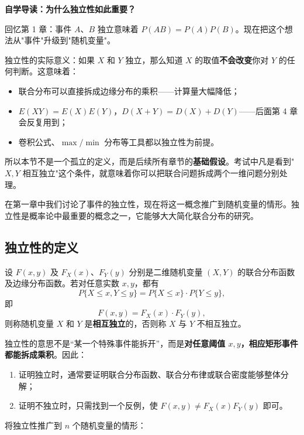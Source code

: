 ﻿\documentclass[lang=cn,11pt]{elegantbook}
\begin{document}
\begin{note}
\textbf{自学导读：为什么独立性如此重要？}

回忆第 1 章：事件 $A$、$B$ 独立意味着 $P(AB)=P(A)P(B)$。现在把这个想法从"事件"升级到"随机变量"。

独立性的实际意义：如果 $X$ 和 $Y$ 独立，那么知道 $X$ 的取值\textbf{不会改变}你对 $Y$ 的任何判断。这意味着：
\begin{itemize}
    \item 联合分布可以直接拆成边缘分布的乘积——计算量大幅降低；
    \item $E(XY)=E(X)E(Y)$，$D(X+Y)=D(X)+D(Y)$——后面第 4 章会反复用到；
    \item 卷积公式、$\max/\min$ 分布等工具都以独立性为前提。
\end{itemize}
所以本节不是一个孤立的定义，而是后续所有章节的\textbf{基础假设}。考试中凡是看到"$X,Y$ 相互独立"这个条件，就意味着你可以把联合问题拆成两个一维问题分别处理。
\end{note}

在第一章中我们讨论了事件的独立性，现在将这一概念推广到随机变量的情形。独立性是概率论中最重要的概念之一，它能够大大简化联合分布的研究。

\subsection{独立性的定义}

\begin{definition}[两个随机变量的独立性] \label{def:2d-independence}
设 $F(x,y)$ 及 $F_X(x)$、$F_Y(y)$ 分别是二维随机变量 $(X,Y)$ 的联合分布函数及边缘分布函数。若对任意实数 $x, y$，都有
\[
P\{X \leqslant x, Y \leqslant y\} = P\{X \leqslant x\} \cdot P\{Y \leqslant y\},
\]
即
\[
F(x,y) = F_X(x) \cdot F_Y(y),
\]
则称随机变量 $X$ 和 $Y$ 是\textbf{相互独立}的，否则称 $X$ 与 $Y$ 不相互独立。
\end{definition}

\begin{note}
独立性的意思不是“某一个特殊事件能拆开”，而是\textbf{对任意阈值 $x,y$，相应矩形事件都能拆成乘积}。因此：
\begin{enumerate}
    \item 证明独立时，通常要证明联合分布函数、联合分布律或联合密度能够整体分解；
    \item 证明不独立时，只需找到一个反例，使 $F(x,y)\neq F_X(x)F_Y(y)$ 即可。
\end{enumerate}
\end{note}

将独立性推广到 $n$ 个随机变量的情形：
\end{document}
